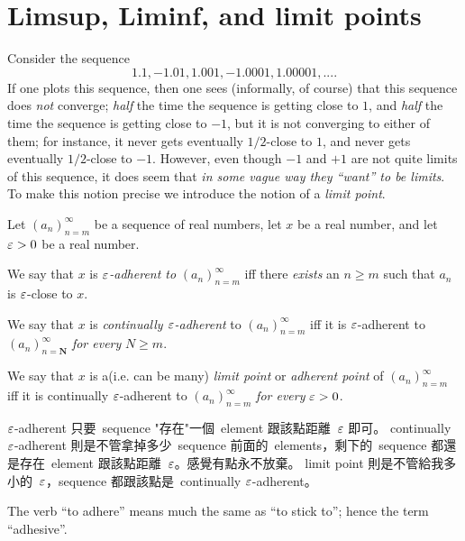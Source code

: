 \section{Limsup, Liminf, and limit points} \label{sec 6.4}

Consider the sequence
\[
    1.1, -1.01, 1.001, -1.0001, 1.00001,....
\]
If one plots this sequence, then one sees (informally, of course) that this sequence does \emph{not} converge;
\emph{half} the time the sequence is getting close to \(1\), and \emph{half} the time the sequence is getting close to \(-1\), but it is not converging to either of them;
for instance, it never gets eventually \(1/2\)-close to \(1\), and never gets eventually \(1/2\)-close to \(-1\).
However, even though \(-1\) and \(+1\) are not quite limits of this sequence, it does seem that \emph{in some vague way they “want” to be limits}.
To make this notion precise we introduce the notion of a \emph{limit point}.

\begin{definition}  \label{def 6.4.1}
Let \((a_n)_{n = m}^{\infty}\) be a sequence of real numbers, let \(x\) be a real number, and let \(\varepsilon > 0\) be a real number.

 We say that \(x\) is \emph{\(\varepsilon\)-adherent to} \((a_n)_{n = m}^{\infty}\) iff there \emph{exists} an \(n \ge m\) such that \(a_n\) is \(\varepsilon\)-close to \(x\).

 We say that \(x\) is \emph{continually \(\varepsilon\)-adherent} to \((a_n)_{n = m}^{\infty}\) iff it is \(\varepsilon\)-adherent to \((a_n)_{n = \textbf{N}}^{\infty}\) \emph{for every} \(N \ge m\).

 We say that \(x\) is a(i.e. can be many) \emph{limit point} or \emph{adherent point} of \((a_n)_{n = m}^{\infty}\) iff it is continually \(\varepsilon\)-adherent to \((a_n)_{n = m}^{\infty}\) \emph{for every} \(\varepsilon > 0\).
\end{definition}

\begin{note}
\(\varepsilon\)-adherent 只要\ sequence "存在"一個\ element 跟該點距離\ \(\varepsilon\) 即可。
continually \(\varepsilon\)-adherent 則是不管拿掉多少\ sequence 前面的\ elements，剩下的\ sequence 都還是存在\ element 跟該點距離\ \(\varepsilon\)。感覺有點永不放棄。
limit point 則是不管給我多小的\ \(\varepsilon\)，sequence 都跟該點是\ continually \(\varepsilon\)-adherent。
\end{note}

\begin{remark} \label{remark 6.4.2}
The verb ``to adhere'' means much the same as ``to stick to'';
hence the term ``adhesive''.
\end{remark}

